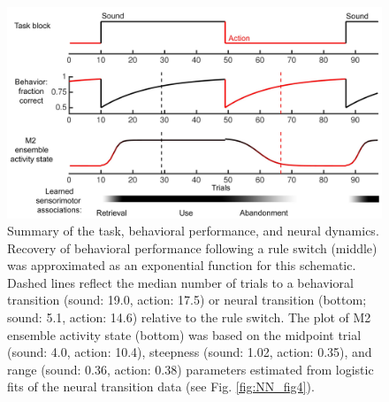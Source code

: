 \begin{figure}[htbp]

\begin{center}
\includegraphics[width=\textwidth]{Figures/NN_figS9.jpg} 
\end{center}

\caption[Summary of the task, behavioral performance, and neural dynamics.]
{Summary of the task, behavioral performance, and neural dynamics. Recovery of behavioral performance following a rule switch (middle) was approximated as an exponential function for this schematic. Dashed lines reflect the median number of trials to a behavioral transition (sound: 19.0, action: 17.5) or neural transition (bottom; sound: 5.1, action: 14.6) relative to the rule switch. The plot of M2 ensemble activity state (bottom) was based on the midpoint trial (sound: 4.0, action: 10.4), steepness (sound: 1.02, action: 0.35), and range (sound: 0.36, action: 0.38) parameters estimated from logistic fits of the neural transition data (see Fig. \ref{fig:NN_fig4}).
}

\label{fig:NN_figS9}
\end{figure}